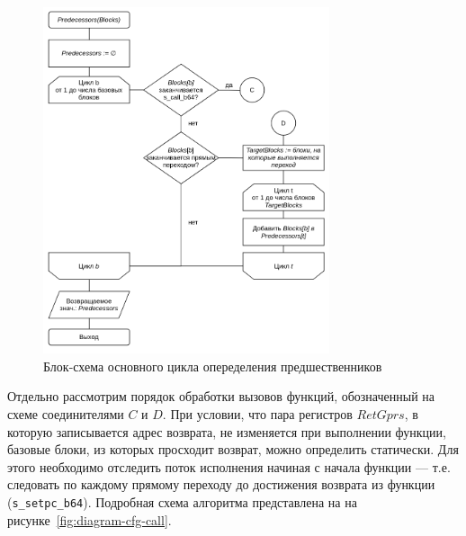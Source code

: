 \documentclass[a4paper,14pt]{extarticle}
\begin{document}
{\begin{figure}[H]
\centering
\includegraphics[width=0.75\textwidth]{diagrams/alg-cfg}
\caption{Блок-схема основного цикла опеределения предшественников}
\label{fig:diagram-cfg}
\end{figure}

Отдельно рассмотрим порядок обработки вызовов функций, обозначенный на схеме
соединителями $C$ и $D$. При условии, что пара регистров $RetGprs$, в которую
записывается адрес возврата, не изменяется при выполнении функции,
базовые блоки, из которых просходит возврат, можно определить статически.
Для этого необходимо отследить поток исполнения начиная с начала функции —
т.е. следовать по каждому прямому переходу до достижения возврата из функции
(\verb|s_setpc_b64|). Подробная схема алгоритма представлена на
на рисунке~\ref{fig:diagram-cfg-call}.

}
\end{document}
